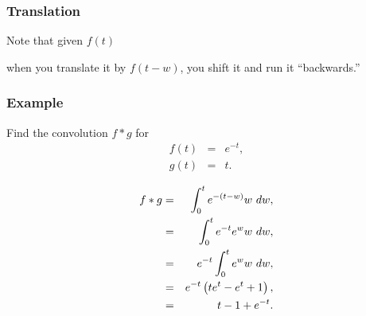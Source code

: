 \begin{frame}
  \frametitle{Translation}

  Note that given $f(t)$


  when you translate it by $f(t-w)$, you shift it and run it
  ``backwards.''


\end{frame}

\begin{frame}
  \frametitle{Example}

  Find the convolution $f*g$ for 
  \begin{eqnarray*}
    f(t) & = & e^{-t}, \\
    g(t) & = & t.
  \end{eqnarray*}

  {%

    \begin{eqnarray*}
      f*g & = & \int^t_0 e^{-(t-w)} w ~ dw, \\
      & = & \int^t_0 e^{-t} e^{w} w ~ dw, \\
      & = & e^{-t} \int^t_0 e^{w} w ~ dw, \\
      & = & e^{-t} \left( t e^t - e^t + 1 \right), \\
      & = & t - 1 + e^{-t}.
    \end{eqnarray*}

  }

\end{frame}



